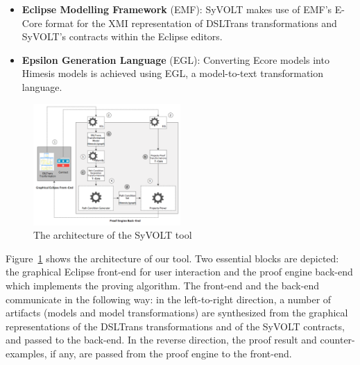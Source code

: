 \begin{itemize}
  \item \textbf{Eclipse Modelling Framework} (EMF): SyVOLT makes
  use of EMF's E-Core format for the XMI representation of DSLTrans transformations
  and SyVOLT's contracts within the Eclipse editors.
  \item \textbf{Epsilon Generation Language} (EGL): Converting
  Ecore models into Himesis models is achieved using EGL, a
  model-to-text transformation language.
\end{itemize}

\begin{figure}
\centering
\includegraphics[width=0.5\textwidth]{figures/tooling_arch}
\caption{The architecture of the SyVOLT tool}
\label{fig:arch}
\end{figure}


Figure~\ref{fig:arch} shows the architecture of our tool. Two essential
blocks are depicted: the graphical Eclipse front-end for user interaction and the proof engine
back-end which implements the proving algorithm. The front-end and the back-end communicate in the following way:
in the left-to-right direction, a number of artifacts (models and model
transformations) are synthesized from the graphical representations of the
DSLTrans transformations and of the SyVOLT contracts, and passed to the
back-end. In the reverse direction, the proof result and counter-examples, if
any, are passed from the proof engine to the front-end.

